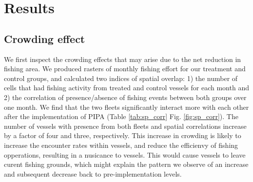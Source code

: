 \documentclass[9p,twocolumn,twoside,lineno]{pnas-new}
\begin{document}
\section{Results}\label{results}

\subsection{Crowding effect}

We first inspect the crowding effects that may arise due to the net reduction in fishing area. We produced rasters of monthly fishing effort for our treatment and control groups, and calculated two indices of spatial overlap: 1) the number of cells that had fishing activity from treated and control vessels for each month and 2) the correlation of presence/absence of fishing events between both groups over one month. We find that the two fleets significantly interact more with each other after the implementation of PIPA (Table \ref{tab:sp_corr} Fig. \ref{fig:sp_corr}). The number of vessels with presence from both fleets and spatial correlations increase by a factor of four and three, respectively. This increase in crowding is likely to increase the encounter rates within vessels, and reduce the efficienvy of fishing opperations, resulting in a nusicance to vessels. This would cause vessels to leave curent fishing grounds, which might explain the pattern we observe of an increase and subsequent decrease back to pre-implementation levels.
\end{document}
